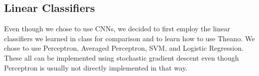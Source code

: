 \subsection{Linear Classifiers}

Even though we chose to use CNNs, we decided to first employ the linear classifiers we learned in class for comparison and to learn how to use Theano.  We chose to use Perceptron, Averaged Perceptron, SVM, and Logistic Regression.  These all can be implemented using stochastic gradient descent even though Perceptron is usually not directly implemented in that way.

